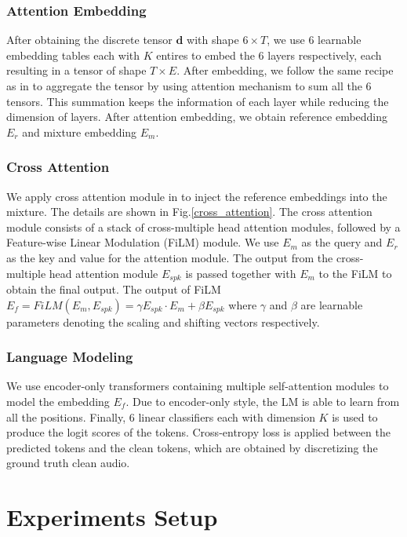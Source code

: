 \documentclass[conference]{IEEEtran}
\begin{document}
\subsubsection{Attention Embedding}
After obtaining the discrete tensor \(\bm{d}\) with shape \(6 \times T\), we use 6
learnable embedding tables each with \(K\) entires to embed the 6 layers 
respectively, each resulting in a tensor of shape \(T \times E\). 
After embedding, we follow the same recipe as in \cite{dasb} to 
aggregate the tensor by using attention mechanism to sum all the 6 tensors. This summation 
keeps the information of each layer while reducing the 
dimension of layers. After attention embedding, we obtain reference embedding \(E_r\) and 
mixture embedding \(E_m\).

\subsubsection{Cross Attention}
We apply cross attention module in \cite{usef_tes} to inject the reference embeddings into the mixture. The details 
are shown in Fig.\ref{cross_attention}.
The cross attention module consists of a stack of cross-multiple head attention modules, followed by
a Feature-wise Linear Modulation (FiLM) module. 
We use \(E_m\) as the query and \(E_r\) as the key and value for 
the attention module. The output from the cross-multiple head attention module \(E_{spk}\)
is passed together with \(E_m\) to the FiLM to obtain the final output. The output of 
FiLM  \(E_f = FiLM(E_m, E_{spk}) = \gamma E_{spk} \cdot E_m  + \beta E_{spk} \) where 
\(\gamma\) and \(\beta\) are learnable parameters denoting the scaling and shifting vectors 
respectively.

\subsubsection{Language Modeling}
We use encoder-only transformers containing multiple self-attention modules to model the 
embedding \(E_f\). Due to encoder-only style, the LM is able to learn from all the positions. 
Finally, 6 linear classifiers each with dimension \(K\) is used to produce the logit scores of the tokens.
Cross-entropy loss is applied between the predicted tokens and the clean tokens, which are obtained by discretizing the ground truth clean audio.

\section{Experiments Setup}
\end{document}
